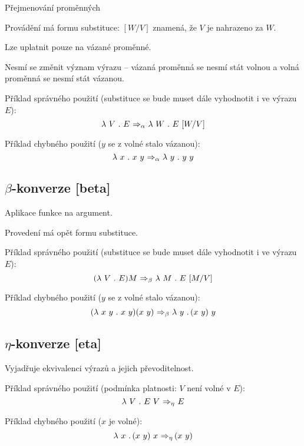 \begin{compactitem}
    \item Přejmenování proměnných

    \item Provádění má formu substituce: $[W/V]$ znamená, že $V$ je nahrazeno za $W$.

    \item Lze uplatnit pouze na vázané proměnné.

    \item Nesmí se změnit význam výrazu -- vázaná proměnná se nesmí stát volnou a volná proměnná se nesmí stát vázanou.

    \item Příklad správného použití (substituce se bude muset dále vyhodnotit i ve výrazu $E$):
    $$
        \operatorname{\lambda\,} V \operatorname{\,.\,} E \operatorname{\,\Rightarrow_{\alpha}\,} \operatorname{\lambda\,} W \operatorname{\,.\,} E ~ [W/V]
    $$

    \item Příklad chybného použití ($y$ se z volné stalo vázanou):
    $$
        \operatorname{\lambda\,} x \operatorname{\,.\,} x ~ y \operatorname{\,\Rightarrow_{\alpha}\,} \operatorname{\lambda\,} y \operatorname{\,.\,} y ~ y
    $$
\end{compactitem}

\subsection{$\beta$-konverze [beta]}

\begin{compactitem}
    \item Aplikace funkce na argument.

    \item Provedení má opět formu substituce.

    \item Příklad správného použití (substituce se bude muset dále vyhodnotit i ve výrazu $E$):
    $$
        ( \operatorname{\lambda\,} V \operatorname{\,.\,} E ) M \operatorname{\,\Rightarrow_{\beta}\,} \operatorname{\lambda\,} M \operatorname{\,.\,} E ~ [M/V]
    $$

    \item Příklad chybného použití ($y$ se z volné stalo vázanou):
    $$
        ( \operatorname{\lambda\,} x ~ y \operatorname{\,.\,} x ~ y ) ( x ~ y ) \operatorname{\,\Rightarrow_{\beta}\,} \operatorname{\lambda\,} y \operatorname{\,.\,} (x ~ y) ~ y
    $$
\end{compactitem}

\subsection{$\eta$-konverze [eta]}

\begin{compactitem}
    \item Vyjadřuje ekvivalenci výrazů a jejich převoditelnost.

    \item Příklad správného použití (podmínka platnosti: $V$ není volné v $E$):
    $$ \operatorname{\lambda\,} V \operatorname{\,.\,} E ~ V \operatorname{\,\Rightarrow_{\eta}\,} E $$

    \item Příklad chybného použití ($x$ je volné):
    $$ \operatorname{\lambda\,} x \operatorname{\,.\,} (x ~ y) ~ x \operatorname{\,\Rightarrow_{\eta}\,} (x ~ y) $$

\end{compactitem}

